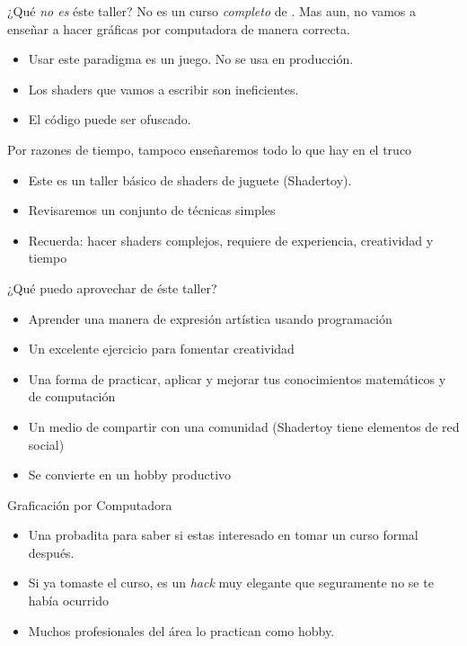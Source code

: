 \begin{frame}{¿Qué \emph{no es} éste taller?}
    No es un curso \emph{completo} de .
    Mas aun, no vamos a enseñar a hacer gráficas por computadora de manera correcta.
    \begin{itemize}
         \item Usar este paradigma \alert{es un juego}. No se usa en producción.
         \item Los shaders que vamos a escribir son ineficientes.
         \item El código puede ser ofuscado.
     \end{itemize}
     Por razones de tiempo, tampoco enseñaremos todo lo que hay en el truco
     \begin{block}{}
         \begin{itemize}
            \item Este es un taller \alert{básico} de shaders de juguete (Shadertoy).
            \item Revisaremos un conjunto de técnicas simples
            \item Recuerda: hacer shaders complejos, requiere de experiencia, creatividad y tiempo
        \end{itemize}  
    \end{block}
\end{frame}

\begin{frame}{¿Qué puedo aprovechar de éste taller?}
    \begin{itemize}
         \item Aprender una manera de expresión artística usando programación
         \item Un excelente ejercicio para fomentar creatividad 
         \item Una forma de practicar, aplicar y mejorar tus conocimientos matemáticos y de computación
         \item Un medio de compartir con una comunidad (Shadertoy tiene elementos de red social)
         \item Se convierte en un hobby productivo
     \end{itemize}
     
     \begin{block}{Graficación por Computadora}
         \begin{itemize}
            \item Una probadita para saber si estas interesado en tomar un curso formal después.
            \item Si ya tomaste el curso, es un \emph{hack} muy elegante que seguramente no se te había ocurrido
            \item Muchos profesionales del área lo practican como hobby.
        \end{itemize}  
    \end{block}
\end{frame}

